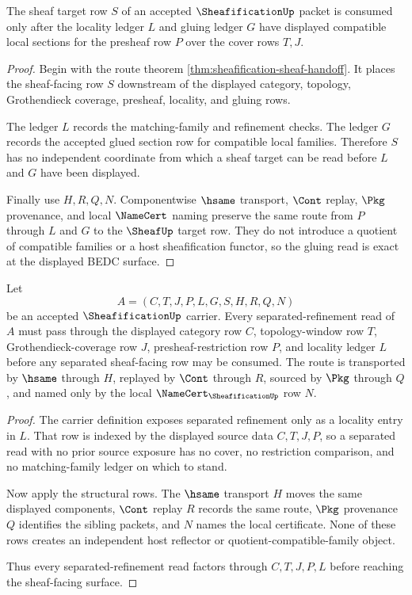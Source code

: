 \begin{theorem}
\label{thm:sheafification-gluing-exactness}
The sheaf target row $S$ of an accepted $\SheafificationUp$ packet is consumed only after the locality ledger $L$ and gluing ledger $G$ have displayed compatible local sections for the presheaf row $P$ over the cover rows $T,J$.
\end{theorem}
\begin{proof}
Begin with the route theorem \autoref{thm:sheafification-sheaf-handoff}. It places the sheaf-facing row $S$ downstream of the displayed category, topology, Grothendieck coverage, presheaf, locality, and gluing rows.

The ledger $L$ records the matching-family and refinement checks. The ledger $G$ records the accepted glued section row for compatible local families. Therefore $S$ has no independent coordinate from which a sheaf target can be read before $L$ and $G$ have been displayed.

Finally use $H,R,Q,N$. Componentwise $\hsame$ transport, $\Cont$ replay, $\Pkg$ provenance, and local $\NameCert$ naming preserve the same route from $P$ through $L$ and $G$ to the $\SheafUp$ target row. They do not introduce a quotient of compatible families or a host sheafification functor, so the gluing read is exact at the displayed BEDC surface.
\end{proof}

\begin{theorem}
\label{thm:sheafification-separated-refinement-exactness}
Let
$$
A=(C,T,J,P,L,G,S,H,R,Q,N)
$$
be an accepted $\SheafificationUp$ carrier. Every separated-refinement read of $A$ must pass through the displayed category row $C$, topology-window row $T$, Grothendieck-coverage row $J$, presheaf-restriction row $P$, and locality ledger $L$ before any separated sheaf-facing row may be consumed. The route is transported by $\hsame$ through $H$, replayed by $\Cont$ through $R$, sourced by $\Pkg$ through $Q$, and named only by the local $\NameCert_{\SheafificationUp}$ row $N$.
\end{theorem}
\begin{proof}
The carrier definition exposes separated refinement only as a locality entry in $L$. That row is indexed by the displayed source data $C,T,J,P$, so a separated read with no prior source exposure has no cover, no restriction comparison, and no matching-family ledger on which to stand.

Now apply the structural rows. The $\hsame$ transport $H$ moves the same displayed components, $\Cont$ replay $R$ records the same route, $\Pkg$ provenance $Q$ identifies the sibling packets, and $N$ names the local certificate. None of these rows creates an independent host reflector or quotient-compatible-family object.

Thus every separated-refinement read factors through $C,T,J,P,L$ before reaching the sheaf-facing surface.
\end{proof}

